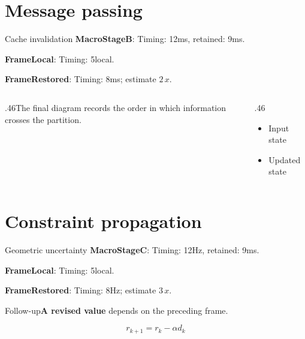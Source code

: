 \documentclass[10pt,aspectratio=169]{beamer}
\newcommand{\fuzzlayerA}[1]{\textbf{#1}}
\newcommand{\fuzzlayerB}[1]{\fuzzlayerA{#1}}
\newcommand{\fuzzlayerC}[1]{\fuzzlayerB{#1}}
\newcommand{\fuzzterm}[1]{\fuzzlayerC{#1}}
\newcommand{\fuzzpair}[2]{\fuzzterm{#1}: #2}
\newcommand{\fuzzunit}{ms}
\let\fuzzoriginalunit\fuzzunit
\newcommand{\fuzzcoefficient}{2}
\newcommand{\fuzzscale}[2][\fuzzcoefficient]{#1\,#2}
\begin{document}
\section{Message passing}
\begin{frame}[t]{Cache invalidation}
\fuzzpair{MacroStageB}{Timing: 12\fuzzunit, retained: 9\fuzzoriginalunit.}\par
{\renewcommand{\fuzzunit}{local}\fuzzpair{FrameLocal}{Timing: 5\fuzzunit.}\par}
\fuzzpair{FrameRestored}{Timing: 8\fuzzunit; estimate $\fuzzscale{x}$.}\par
\begin{columns}[T]\begin{column}{.46\textwidth}The final diagram records the order in which information crosses the partition.\end{column}\begin{column}{.46\textwidth}\begin{itemize}\item Input state\item Updated state\end{itemize}\end{column}\end{columns}
\end{frame}
\renewcommand{\fuzzunit}{Hz}
\renewcommand{\fuzzcoefficient}{3}
\renewcommand{\fuzzterm}[1]{{\textbf{#1}}}
\section{Constraint propagation}
\begin{frame}[t]{Geometric uncertainty}
\fuzzpair{MacroStageC}{Timing: 12\fuzzunit, retained: 9\fuzzoriginalunit.}\par
{\renewcommand{\fuzzunit}{local}\fuzzpair{FrameLocal}{Timing: 5\fuzzunit.}\par}
\fuzzpair{FrameRestored}{Timing: 8\fuzzunit; estimate $\fuzzscale{x}$.}\par
\begin{block}{Follow-up}\fuzzterm{A revised value} depends on the preceding frame.\end{block}
\[r_{k+1}=r_k-\alpha d_k\]
\end{frame}
\renewcommand{\fuzzunit}{steps}
\renewcommand{\fuzzcoefficient}{4}
\renewcommand{\fuzzterm}[1]{{\textrm{#1}}}
\end{document}
